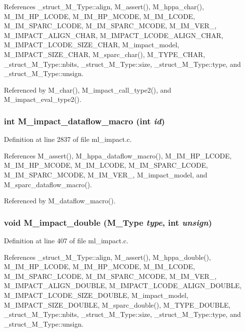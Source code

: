 References \_\-struct\_\-M\_\-Type::align, M\_\-assert(), M\_\-hppa\_\-char(), M\_\-IM\_\-HP\_\-LCODE, M\_\-IM\_\-HP\_\-MCODE, M\_\-IM\_\-LCODE, M\_\-IM\_\-SPARC\_\-LCODE, M\_\-IM\_\-SPARC\_\-MCODE, M\_\-IM\_\-VER\_, M\_\-IMPACT\_\-ALIGN\_\-CHAR, M\_\-IMPACT\_\-LCODE\_\-ALIGN\_\-CHAR, M\_\-IMPACT\_\-LCODE\_\-SIZE\_\-CHAR, M\_\-impact\_\-model, M\_\-IMPACT\_\-SIZE\_\-CHAR, M\_\-sparc\_\-char(), M\_\-TYPE\_\-CHAR, \_\-struct\_\-M\_\-Type::nbits, \_\-struct\_\-M\_\-Type::size, \_\-struct\_\-M\_\-Type::type, and \_\-struct\_\-M\_\-Type::unsign.

Referenced by M\_\-char(), M\_\-impact\_\-call\_\-type2(), and M\_\-impact\_\-eval\_\-type2().
\subsubsection{\setlength{\rightskip}{0pt plus 5cm}int M\_\-impact\_\-dataflow\_\-macro (int {\em id})}\label{m__impact_8h_d1f56f35be1b1788e8ae85c69cc910d3}




Definition at line 2837 of file ml\_\-impact.c.

References M\_\-assert(), M\_\-hppa\_\-dataflow\_\-macro(), M\_\-IM\_\-HP\_\-LCODE, M\_\-IM\_\-HP\_\-MCODE, M\_\-IM\_\-LCODE, M\_\-IM\_\-SPARC\_\-LCODE, M\_\-IM\_\-SPARC\_\-MCODE, M\_\-IM\_\-VER\_, M\_\-impact\_\-model, and M\_\-sparc\_\-dataflow\_\-macro().

Referenced by M\_\-dataflow\_\-macro().
\subsubsection{\setlength{\rightskip}{0pt plus 5cm}void M\_\-impact\_\-double (\bf{M\_\-Type} {\em type}, int {\em unsign})}\label{m__impact_8h_b04477a74ff1bd6c006864e0dc4cc493}




Definition at line 407 of file ml\_\-impact.c.

References \_\-struct\_\-M\_\-Type::align, M\_\-assert(), M\_\-hppa\_\-double(), M\_\-IM\_\-HP\_\-LCODE, M\_\-IM\_\-HP\_\-MCODE, M\_\-IM\_\-LCODE, M\_\-IM\_\-SPARC\_\-LCODE, M\_\-IM\_\-SPARC\_\-MCODE, M\_\-IM\_\-VER\_, M\_\-IMPACT\_\-ALIGN\_\-DOUBLE, M\_\-IMPACT\_\-LCODE\_\-ALIGN\_\-DOUBLE, M\_\-IMPACT\_\-LCODE\_\-SIZE\_\-DOUBLE, M\_\-impact\_\-model, M\_\-IMPACT\_\-SIZE\_\-DOUBLE, M\_\-sparc\_\-double(), M\_\-TYPE\_\-DOUBLE, \_\-struct\_\-M\_\-Type::nbits, \_\-struct\_\-M\_\-Type::size, \_\-struct\_\-M\_\-Type::type, and \_\-struct\_\-M\_\-Type::unsign.

